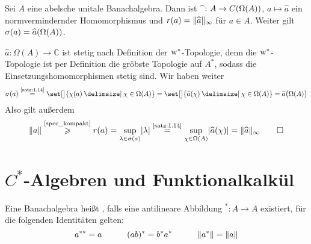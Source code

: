 \begin{satz}[label=satz:117,{name=[Gelfandtransformation ist normvermindernd]}]
	Sei $A$ eine abelsche unitale Banachalgebra.
	Dann ist $\widehat{\hspace{1ex}} \colon A \to C \enbrace*{\Omega(A)}$, $a \mapsto \widehat{a}$ ein normvermindernder Homomorphismus und $r(a) = \Vert\widehat{a}\Vert_{\infty}$ für $a \in A$. 
	Weiter gilt $\sigma(a)= \widehat{a}\enbrace*{\Omega(A)}$.
\end{satz}
\begin{beweis}
	$\widehat{a} \colon \Omega(A) \to \mathbb{C}$ ist stetig nach Definition der $\mkern1mu\mathrm{w}^*$-Topologie, denn die $\mkern1mu\mathrm{w}^*$-Topologie ist per Definition die gröbste Topologie auf $A^*$, sodass die Einsetzungshomomorphismen stetig sind.
	Wir haben weiter
	\[
		\sigma(a) \StackText{\ref{satz:1.14}}{=} \set[\big]{\chi(a) \given \chi \in \Omega(A)}  = \set[\big]{\widehat{a}(\chi) \given \chi \in \Omega(A)} = \widehat{a} 
		\enbrace[\big]{\Omega(A)}
	\]
	Also gilt außerdem
	\[
		\norm{a} \StackText{\ref{spec_kompakt}}{\ge} r(a) = \sup_{\lambda \in \sigma(a)} \abs*{\lambda} \StackText{\ref{satz:1.14}}{=} \sup_{\chi \in \Omega(A)} \abs{\widehat{a}(\chi)} 
		= \norm{\widehat{a}}_{\infty} \qedhere
	\]
\end{beweis}
\newpage

\section{$C^*$-Algebren und Funktionalkalkül} %
\label{sec:2}

\begin{definition}[{name=[Involutive Banachalgebra]}]
	Eine Banachalgebra heißt , falls eine antilineare Abbildung ${}^* \colon A \to A$ existiert, für die folgenden Identitäten gelten:
	\[
		a^{**}=a \qquad \quad (ab)^*= b^* a^* \qquad \quad \Vert a^*\Vert = \Vert a\Vert  
	\] 
\end{definition}

